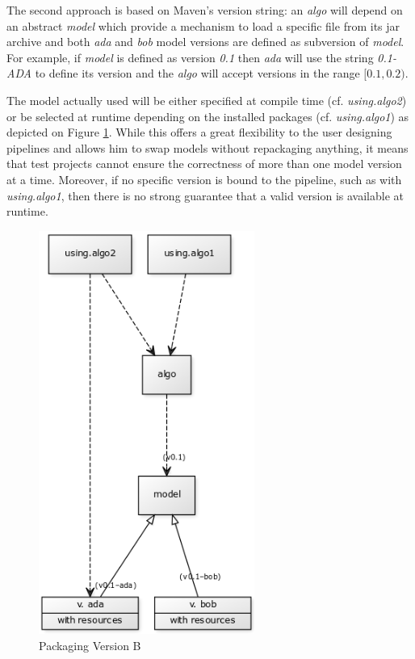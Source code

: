 \documentclass{article}
\newcommand{\id}[1]{\mbox{\textit{#1}}}
\begin{document}
The second approach is based on Maven's version string: an \id{algo} will depend on an abstract \id{model} which provide a mechanism to load a specific file from its jar archive and both \id{ada} and \id{bob} model versions are defined as subversion of \id{model}. For example, if \id{model} is defined as version \id{0.1} then \id{ada} will use the string \id{0.1-ADA} to define its version and the \id{algo} will accept versions in the range $ [0.1,0.2) $.

The model actually used will be either specified at compile time (cf. \id{using.algo2}) or be selected at runtime depending on the installed packages (cf. \id{using.algo1}) as depicted on Figure \ref{fig:pkgsysB}. While this offers a great flexibility to the user designing pipelines and allows him to swap models without repackaging anything, it means that test projects cannot ensure the correctness of more than one model version at a time. Moreover, if no specific version is bound to the pipeline, such as with \id{using.algo1}, then there is no strong guarantee that a valid version is available at runtime.

\begin{figure}
\centering
\includegraphics[width=200pt]{res/packaging_version_B.png}
\caption{Packaging Version B}
\label{fig:pkgsysB}
\end{figure}
\end{document}
